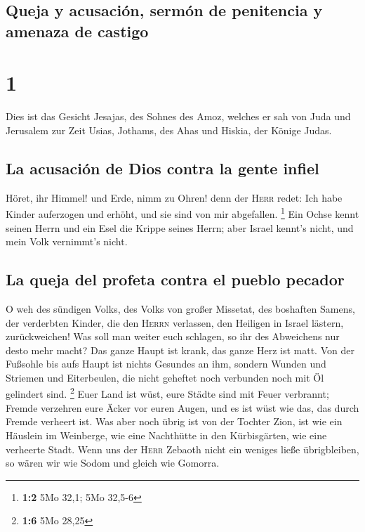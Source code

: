 \hypertarget{queja-y-acusaciuxf3n-sermuxf3n-de-penitencia-y-amenaza-de-castigo}{%
\subsection{Queja y acusación, sermón de penitencia y amenaza de
castigo}\label{queja-y-acusaciuxf3n-sermuxf3n-de-penitencia-y-amenaza-de-castigo}}

\hypertarget{section}{%
\section{1}\label{section}}

 Dies ist das Gesicht Jesajas, des Sohnes des Amoz,
welches er sah von Juda und Jerusalem zur Zeit Usias, Jothams, des Ahas
und Hiskia, der Könige Judas.

\hypertarget{la-acusaciuxf3n-de-dios-contra-la-gente-infiel}{%
\subsection{La acusación de Dios contra la gente
infiel}\label{la-acusaciuxf3n-de-dios-contra-la-gente-infiel}}

 Höret, ihr Himmel! und Erde, nimm zu Ohren! denn der
\textsc{Herr} redet: Ich habe Kinder auferzogen und erhöht, und sie sind
von mir abgefallen. \footnote{\textbf{1:2} 5Mo 32,1; 5Mo 32,5-6}
 Ein Ochse kennt seinen Herrn und ein Esel die Krippe
seines Herrn; aber Israel kennt's nicht, und mein Volk vernimmt's nicht.

\hypertarget{la-queja-del-profeta-contra-el-pueblo-pecador}{%
\subsection{La queja del profeta contra el pueblo
pecador}\label{la-queja-del-profeta-contra-el-pueblo-pecador}}

 O weh des sündigen Volks, des Volks von großer Missetat,
des boshaften Samens, der verderbten Kinder, die den \textsc{Herrn}
verlassen, den Heiligen in Israel lästern, zurückweichen! 
Was soll man weiter euch schlagen, so ihr des Abweichens nur desto mehr
macht? Das ganze Haupt ist krank, das ganze Herz ist matt.
 Von der Fußsohle bis aufs Haupt ist nichts Gesundes an
ihm, sondern Wunden und Striemen und Eiterbeulen, die nicht geheftet
noch verbunden noch mit Öl gelindert sind. \footnote{\textbf{1:6} 5Mo
  28,25}  Euer Land ist wüst, eure Städte sind mit Feuer
verbrannt; Fremde verzehren eure Äcker vor euren Augen, und es ist wüst
wie das, das durch Fremde verheert ist.  Was aber noch
übrig ist von der Tochter Zion, ist wie ein Häuslein im Weinberge, wie
eine Nachthütte in den Kürbisgärten, wie eine verheerte Stadt.
 Wenn uns der \textsc{Herr} Zebaoth nicht ein weniges
ließe übrigbleiben, so wären wir wie Sodom und gleich wie Gomorra.

